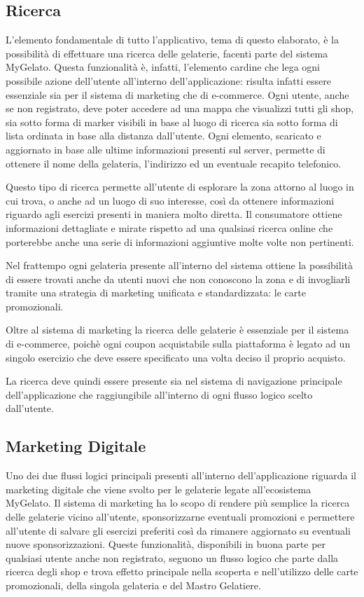 \subsection{Ricerca}
L'elemento fondamentale di tutto l'applicativo, tema di questo elaborato, è la possibilità di effettuare una ricerca delle gelaterie, facenti parte del sistema MyGelato.
Questa funzionalità è, infatti, l'elemento cardine che lega ogni possibile azione dell'utente all'interno dell'applicazione: risulta infatti essere essenziale sia per il sistema di marketing che di e-commerce.
Ogni utente, anche se non registrato, deve poter accedere ad una mappa che visualizzi tutti gli shop, sia sotto forma di marker visibili in base al luogo di ricerca sia sotto forma di lista ordinata in base alla distanza dall'utente.
Ogni elemento, scaricato e aggiornato in base alle ultime informazioni presenti sul server, permette di ottenere il nome della gelateria, l'indirizzo ed un eventuale recapito telefonico.

Questo tipo di ricerca permette all'utente di esplorare la zona attorno al luogo in cui trova, o anche ad un luogo di suo interesse, così da ottenere informazioni riguardo agli esercizi presenti in maniera molto diretta.
Il consumatore ottiene informazioni dettagliate e mirate rispetto ad una qualsiasi ricerca online che porterebbe anche una serie di informazioni aggiuntive molte volte non pertinenti.

Nel frattempo ogni gelateria presente all'interno del sistema ottiene la possibilità di essere trovati anche da utenti nuovi che non conoscono la zona e di invogliarli tramite una strategia di marketing unificata e standardizzata: le carte promozionali.

Oltre al sistema di marketing la ricerca delle gelaterie è essenziale per il sistema di e-commerce, poichè ogni coupon acquistabile sulla piattaforma è legato ad un singolo esercizio che deve essere specificato una volta deciso il proprio acquisto.

La ricerca deve quindi essere presente sia nel sistema di navigazione principale dell'applicazione che raggiungibile all'interno di ogni flusso logico scelto dall'utente.

\subsection{Marketing Digitale}
Uno dei due flussi logici principali presenti all'interno dell'applicazione riguarda il marketing digitale che viene svolto per le gelaterie legate all'ecosistema MyGelato.
Il sistema di marketing ha lo scopo di rendere più semplice la ricerca delle gelaterie vicino all'utente, sponsorizzarne eventuali promozioni e permettere all'utente di salvare gli esercizi preferiti così da rimanere aggiornato su eventuali nuove sponsorizzazioni.
Queste funzionalità, disponibili in buona parte per qualsiasi utente anche non registrato, seguono un flusso logico che parte dalla ricerca degli shop e trova effetto principale nella scoperta e nell'utilizzo delle carte promozionali, della singola gelateria e del Mastro Gelatiere.

